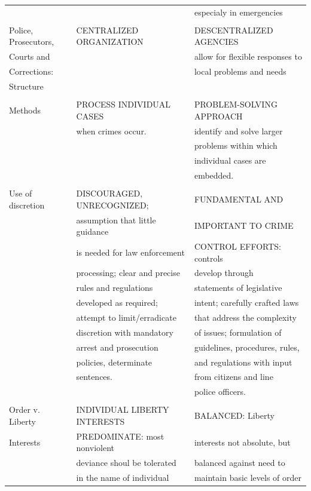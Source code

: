 \documentclass[
	12pt,				%
	openright,			%
	twoside,			%
	a4paper,			%
	chapter=TITLE,		%
	section=TITLE,		%
	subsection=TITLE,	%
	subsubsection=TITLE,%
	spanish,            %
	english,			%
	brazil				%
	]{abntex2}
\begin{document}
\begin{table}[!htpb]
\begin{tiny}
\begin{center}
\begin{tabular}{lll}
							& & especialy in emergencies \\\\
			Police, Prosecutors, & CENTRALIZED ORGANIZATION & DESCENTRALIZED AGENCIES \\
			Courts and & & allow for flexible responses to \\
			Corrections: & & local problems and needs \\
			Structure & & \\\\
			Methods & PROCESS INDIVIDUAL CASES & PROBLEM-SOLVING APPROACH \\
			& when crimes occur. & identify and solve larger \\
			& & problems within which \\
			& & individual cases are\\
			& & embedded.\\\\
			Use of discretion & DISCOURAGED, UNRECOGNIZED; & FUNDAMENTAL AND \\
			& assumption that little guidance & IMPORTANT TO CRIME \\
			& is needed for law enforcement & CONTROL EFFORTS: controls \\
			& processing; clear and precise & develop through\\
			& rules and regulations & statements of legislative \\
			& developed as required; & intent; carefully crafted laws \\
			& attempt to limit/erradicate & that address the complexity \\
			& discretion with mandatory & of issues; formulation of \\
			& arrest and prosecution & guidelines, procedures, rules, \\
			& policies, determinate & and regulations with input \\
			& sentences. & from citizens and line \\
			& & police officers.\\\\
			Order v. Liberty & INDIVIDUAL LIBERTY INTERESTS & BALANCED: Liberty\\
					Interests & PREDOMINATE: most nonviolent & interests not absolute, but \\
			& deviance shoul be tolerated & balanced against need to \\
			& in the name of individual & maintain basic levels of order\\

\end{tabular}
\end{center}
\end{tiny}
\end{table}
\end{document}
